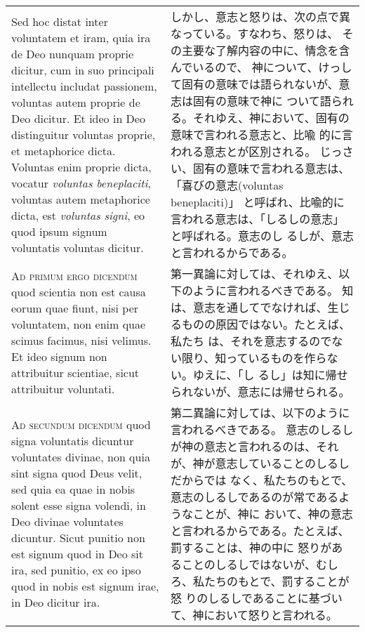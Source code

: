 \documentclass[10pt]{jsarticle} %
\begin{document}
\begin{longtable}{p{21em}p{21em}}
\\

Sed hoc distat inter voluntatem et iram, quia ira
de Deo nunquam proprie dicitur, cum in suo principali intellectu
includat passionem, voluntas autem proprie de Deo dicitur. Et ideo in
Deo distinguitur voluntas proprie, et metaphorice dicta. Voluntas enim
proprie dicta, vocatur {\itshape voluntas beneplaciti}, voluntas autem metaphorice
dicta, est {\itshape voluntas signi}, eo quod ipsum signum voluntatis voluntas
dicitur.


&
しかし、意志と怒りは、次の点で異なっている。すなわち、怒りは、
 その主要な了解内容の中に、情念を含んでいるので、
 神について、けっして固有の意味では語られないが、意志は固有の意味で神に
 ついて語られる。それゆえ、神において、固有の意味で言われる意志と、比喩
 的に言われる意志とが区別される。
じっさい、固有の意味で言われる意志は、「喜びの意志(voluntas beneplaciti)」
 と呼ばれ、比喩的に言われる意志は、「しるしの意志」と呼ばれる。意志のし
 るしが、意志と言われるからである。



\\



{\scshape Ad primum ergo dicendum} quod scientia non
est causa eorum quae fiunt, nisi per voluntatem, non enim quae scimus
facimus, nisi velimus. Et ideo signum non attribuitur scientiae, sicut
attribuitur voluntati.


&

第一異論に対しては、それゆえ、以下のように言われるべきである。
知は、意志を通してでなければ、生じるものの原因ではない。たとえば、私たち
 は、それを意志するのでない限り、知っているものを作らない。ゆえに、「し
 るし」は知に帰せられないが、意志には帰せられる。


\\


{\scshape Ad secundum dicendum} quod signa voluntatis
dicuntur voluntates divinae, non quia sint signa quod Deus velit, sed
quia ea quae in nobis solent esse signa volendi, in Deo divinae
voluntates dicuntur. Sicut punitio non est signum quod in Deo sit ira,
sed punitio, ex eo ipso quod in nobis est signum irae, in Deo dicitur
ira.


&

第二異論に対しては、以下のように言われるべきである。
意志のしるしが神の意志と言われるのは、それが、神が意志していることのしるしだからでは
 なく、私たちのもとで、意志のしるしであるのが常であるようなことが、神に
 おいて、神の意志と言われるからである。たとえば、罰することは、神の中に
 怒りがあることのしるしではないが、むしろ、私たちのもとで、罰することが怒
 りのしるしであることに基づいて、神において怒りと言われる。



\end{longtable}
\newpage
\end{document}
